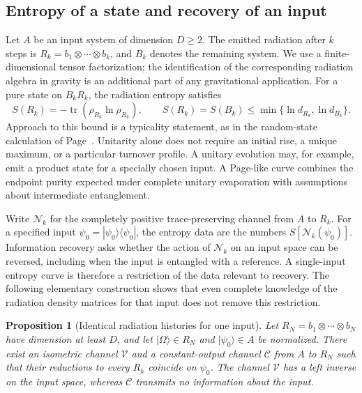 \documentclass[11pt,letterpaper]{article}
\theoremstyle{plain}
\newtheorem{proposition}[theorem]{Proposition}
\theoremstyle{definition}
\theoremstyle{remark}
\newcommand{\Ccal}{\mathcal{C}}
\newcommand{\Ncal}{\mathcal{N}}
\newcommand{\Vcal}{\mathcal{V}}
\DeclareMathOperator{\tr}{tr}
\begin{document}
\subsection{Entropy of a state and recovery of an input}
\label{subsec14:page_curve_meaning}

Let $A$ be an input system of dimension $D\geq2$. The emitted radiation
after $k$ steps is $R_k=b_1\otimes\cdots\otimes b_k$, and $B_k$ denotes
the remaining system. We use a finite-dimensional tensor factorization;
the identification of the corresponding radiation algebra in gravity is
an additional part of any gravitational application. For a pure state on
$B_kR_k$, the radiation entropy satisfies
\begin{equation}
 S(R_k)=-\tr(\rho_{R_k}\ln\rho_{R_k}),\qquad
 S(R_k)=S(B_k)\leq\min\{\ln d_{R_k},\ln d_{B_k}\}.
 \label{eq14:entropy_bound}
\end{equation}
Approach to this bound is a typicality statement, as in the random-state
calculation of Page~\citep{page1993}. Unitarity alone does not require an
initial rise, a unique maximum, or a particular turnover profile. A
unitary evolution may, for example, emit a product state for a specially
chosen input. A Page-like curve combines the endpoint purity expected
under complete unitary evaporation with assumptions about intermediate
entanglement.

Write $\Ncal_k$ for the completely positive trace-preserving channel from
$A$ to $R_k$. For a specified input $\psi_0=|\psi_0\rangle\langle\psi_0|$,
the entropy data are the numbers $S[\Ncal_k(\psi_0)]$. Information
recovery asks whether the action of $\Ncal_k$ on an input space can be
reversed, including when the input is entangled with a reference. A
single-input entropy curve is therefore a restriction of the data
relevant to recovery. The following elementary construction shows that
even complete knowledge of the radiation density matrices for that
input does not remove this restriction.

\begin{proposition}[Identical radiation histories for one input]
\label{prop14:channel_counterexample}
Let $R_N=b_1\otimes\cdots\otimes b_N$ have dimension at least $D$, and
let $|\Omega\rangle\in R_N$ and $|\psi_0\rangle\in A$ be normalized.
There exist an isometric channel $\Vcal$ and a constant-output channel
$\Ccal$ from $A$ to $R_N$ such that their reductions to every $R_k$
coincide on $\psi_0$. The channel $\Vcal$ has a left inverse on the
input space, whereas $\Ccal$ transmits no information about the input.
\end{proposition}
\end{document}
